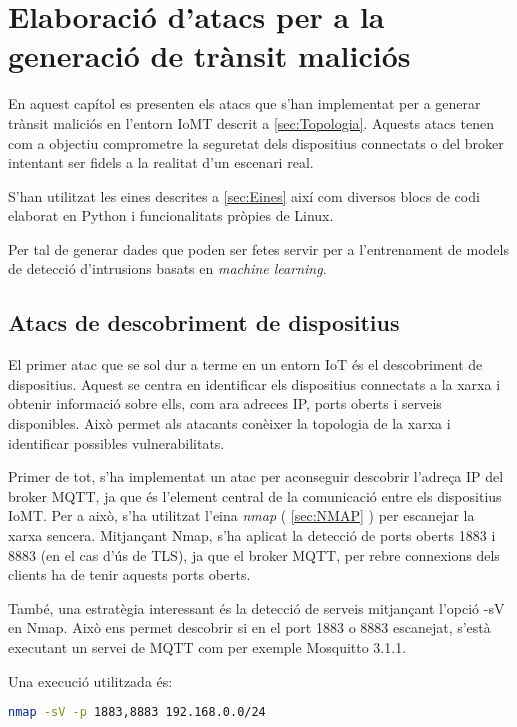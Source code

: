 \chapter{Elaboració d'atacs per a la generació de trànsit maliciós}

En aquest capítol es presenten els atacs que s'han implementat per a generar trànsit maliciós en l'entorn IoMT descrit a \ref{sec:Topologia}. Aquests atacs tenen com a objectiu comprometre la seguretat dels dispositius connectats o del broker intentant ser fidels a la realitat d'un escenari real. 

S'han utilitzat les eines descrites a \ref{sec:Eines} així com diversos blocs de codi elaborat en Python i funcionalitats pròpies de Linux. 


Per tal de generar dades que poden ser fetes servir per a l'entrenament de models de detecció d'intrusions basats en \textit{machine learning}.



\section{Atacs de descobriment de dispositius}
\label{sec:Recon}

El primer atac que se sol dur a terme en un entorn IoT és el descobriment de dispositius. Aquest se centra en identificar els dispositius connectats a la xarxa i obtenir informació sobre ells, com ara adreces IP, ports oberts i serveis disponibles. Això permet als atacants conèixer la topologia de la xarxa i identificar possibles vulnerabilitats.

Primer de tot, s'ha implementat un atac per aconseguir descobrir l'adreça IP del broker MQTT, ja que és l'element central de la comunicació entre els dispositius IoMT. Per a això, s'ha utilitzat l'eina \textit{nmap} ( \ref{sec:NMAP} ) per escanejar la xarxa sencera. Mitjançant Nmap, s'ha aplicat la detecció de ports oberts 1883 i 8883 (en el cas d'ús de TLS), ja que el broker MQTT, per rebre connexions dels clients ha de tenir aquests ports oberts.

També, una estratègia interessant és la detecció de serveis mitjançant l'opció -sV en Nmap. Això ens permet descobrir si en el port 1883 o 8883 escanejat, s'està executant un servei de MQTT com per exemple Mosquitto 3.1.1.

Una execució utilitzada és:
\begin{lstlisting}[language=bash, caption={Escaneig Nmap}, label=Escaneig Nmap]
    nmap -sV -p 1883,8883 192.168.0.0/24
\end{lstlisting}

